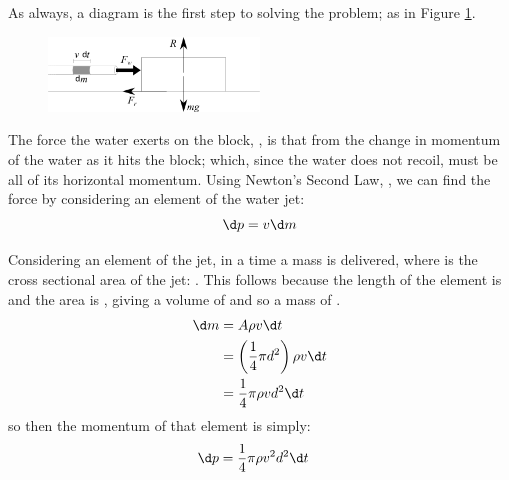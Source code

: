 
\begin{problem} %
{  }
{}
{As always, a diagram is the first step to solving the problem; as in Figure \ref{fig:Dynamics_water_jet_block}.

\begin{figure}[h]
	\centering
	\includegraphics[width=0.5\textwidth]{../../../figures/Dynamics_water_jet_block.svg}
	\caption{}
	\label{fig:Dynamics_water_jet_block}
\end{figure}

The force the water exerts on the block, , is that from the change in momentum of the water as it hits the block; which, since the water does not recoil, must be all of its horizontal momentum. Using Newton's Second Law, , we can find the force by considering an element of the water jet:
\begin{equation*} 
\d p = v \d m 
\end{equation*}

Considering an element of the jet, in a time  a mass  is delivered, where  is the cross sectional area of the jet: . This follows because the length of the element is  and the area is , giving a volume of  and so a mass of .
\begin{align*} 
\d m & = A \rho v \d t \\ 
&= \left(\frac{1}{4}\pi d^{2}\right) \rho v \d t \\
 &= \frac{1}{4} \pi \rho v d^{2} \d t 
 \end{align*}
so then the momentum of that element  is simply:
\begin{align*} 
\d p &= \frac{1}{4}\pi\rho v^{2} d^{2} \d t 
\end{align*}

}
\end{problem}
